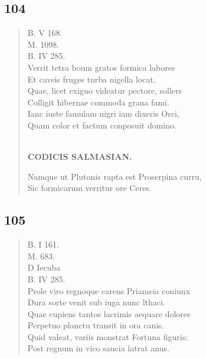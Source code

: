 \documentclass[11pt, a4paper]{report}
\begin{document}
            \subsection*{104}
      \begin{verse}
      B. V 168. \\ M. 1098. \\ B. IV 285. \\ Verrit tetra boum gratos formica labores \\ Et caveis fruges turba nigella locat, \\ Quae, licet exiguo videatur pectore, sollers \\ Colligit hibernae commoda grana fami. \\ Ianc iuste famulam nigri iam dixeris Orci, \\ Quam color et factum conposuit domino. \\ 
        ﻿\pagebreak 
    \begin{center} \textbf{CODICIS SALMASIAN.} \end{center} \marginpar{[127]} Namque ut Plutonis rapta est Proserpina curru, \\ Sic formicarum verritur ore Ceres. \\ 
      \end{verse}
  
            \subsection*{105}
      \begin{verse}
      B. I 161. \\ M. 683. \\ D Iecuba \\ B. IV 285. \\ Prole viro regnoque carens Priameia coniunx \\ Dura sorte venit sub iuga nunc lthaci. \\ Quae cupiens tantos lacrimis aequare dolores \\ Perpetuo planctu transit in ora canis. \\ Quid valeat, variis monstrat Fortuna figuris: \\ Post regnum in vico saucia latrat anus. \\ 
      \end{verse}
  
\end{document}
